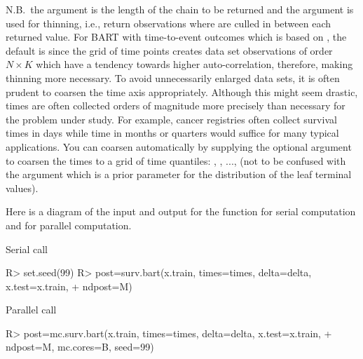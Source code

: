 \documentclass[article]{jss}
\begin{document}
N.B.\ the argument  is the length of the chain to be
returned and the argument  is used for thinning, i.e.,
return  observations where  are culled in
between each returned value.  For BART with time-to-event outcomes
which is based on ,
the default is  since the grid of time points
creates data set observations of order $N \times K$ which have a
tendency towards higher auto-correlation, therefore, making thinning
more necessary.  
To avoid unnecessarily enlarged data sets, it is often prudent to
coarsen the time axis appropriately.  Although this might seem
drastic, times are often collected orders of magnitude more precisely
than necessary for the problem under study.  For example, cancer
registries often collect survival times in days while time in months 
or quarters would suffice for many typical applications.  
You can coarsen
automatically by supplying the optional  argument to coarsen
the times to a grid of time quantiles: , , ...,
 (not to be confused with the  argument which is a
prior parameter for the distribution of the leaf terminal values).

Here is a diagram of the input and output for the 
function for serial computation and  for parallel
computation. 

Serial call  
\begin{Sinput}
R> set.seed(99)
R> post=surv.bart(x.train, times=times, delta=delta, x.test=x.train, 
+    ndpost=M)
\end{Sinput} 
Parallel call
\begin{Sinput}
R> post=mc.surv.bart(x.train, times=times, delta=delta, x.test=x.train, 
+    ndpost=M, mc.cores=B, seed=99) 
\end{Sinput}
\end{document}
